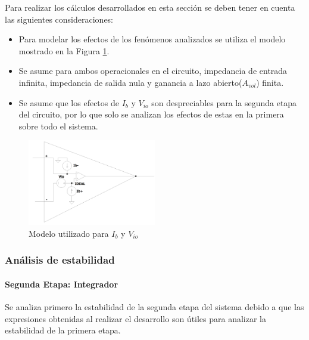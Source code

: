 \noindent Para realizar los c\'alculos desarrollados en esta secci\'on se deben tener en cuenta las siguientes consideraciones:
\begin{itemize}
    \item Para modelar los efectos de los fen\'omenos analizados se utiliza el modelo mostrado en la Figura \ref{fig:Modelo_BIAS}.
    
    \item Se asume para ambos operacionales en el circuito, impedancia de entrada infinita, impedancia de salida nula y ganancia a lazo abierto($A_{vol}$) finita.
    
    \item Se asume que los efectos de $I_b$ y $V_{io}$ son despreciables para la segunda etapa del circuito, por lo que solo se analizan los efectos de estas en la primera sobre todo el sistema.
    
\end{itemize}

\begin{figure}[H]
    \centering
    \includegraphics[width=0.5\textwidth]{../EJ3/Recursos/Modelo}
    \caption{Modelo utilizado para $I_b$ y $V_{io}$}
    \label{fig:Modelo_BIAS}
\end{figure}

\subsubsection{An\'alisis de estabilidad}

\paragraph{Segunda Etapa: Integrador}Se analiza primero la estabilidad de la segunda etapa del sistema debido a que las expresiones obtenidas al realizar el desarrollo son \'utiles para analizar la estabilidad de la primera etapa.


